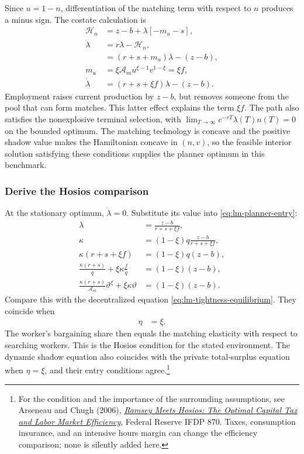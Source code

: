 Since $u=1-n$, differentiation of the matching term with respect to $n$
produces a minus sign. The costate calculation is
\begin{align}
 \mathcal H_n&=z-b+\lambda[-m_u-s],\\
 \dot\lambda&=r\lambda-\mathcal H_n,\\
 &=(r+s+m_u)\lambda-(z-b),\\
 m_u&=\xi\mathcal A_m u^{\xi-1}v^{1-\xi}=\xi f,\\
 \dot\lambda&=(r+s+\xi f)\lambda-(z-b).
 \label{eq:lm-planner-shadow}
\end{align}
Employment raises current production by $z-b$, but removes someone from the
pool that can form matches. This latter effect explains the term $\xi f$.
The path also satisfies the nonexplosive terminal selection, with
$\lim_{T\to\infty}e^{-rT}\lambda(T)n(T)=0$ on the bounded optimum.
The matching technology is concave and the positive shadow value makes the
Hamiltonian concave in $(n,v)$, so the feasible interior solution satisfying
these conditions supplies the planner optimum in this benchmark.

\subsubsection{Derive the Hosios comparison}

At the stationary optimum, $\dot\lambda=0$. Substitute its value into
\eqref{eq:lm-planner-entry}:
\begin{align}
 \lambda&=\frac{z-b}{r+s+\xi f},\\
 \kappa&=(1-\xi)q\frac{z-b}{r+s+\xi f},\\
 \kappa(r+s+\xi f)&=(1-\xi)q(z-b),\\
 \frac{\kappa(r+s)}q+\xi\kappa\frac fq&=(1-\xi)(z-b),\\
 \frac{\kappa(r+s)}{\mathcal A_m}\vartheta^\xi
       +\xi\kappa\vartheta&=(1-\xi)(z-b).
 \label{eq:lm-planner-tightness}
\end{align}
Compare this with the decentralized equation
\eqref{eq:lm-tightness-equilibrium}. They coincide when
\begin{align}
 \eta&=\xi.
 \label{eq:lm-hosios}
\end{align}
The worker's bargaining share then equals the matching elasticity with respect
to searching workers. This is the Hosios condition for the stated environment.
The dynamic shadow equation also coincides with the private total-surplus
equation when $\eta=\xi$, and their entry conditions agree.\footnote{For the
condition and the importance of the surrounding assumptions, see Arseneau and
Chugh (2006),
\href{https://www.federalreserve.gov/pubs/ifdp/2006/870/ifdp870.htm}{\textit{Ramsey
Meets Hosios: The Optimal Capital Tax and Labor Market Efficiency}}, Federal
Reserve IFDP 870. Taxes, consumption insurance, and an intensive hours margin
can change the efficiency comparison; none is silently added here.}

